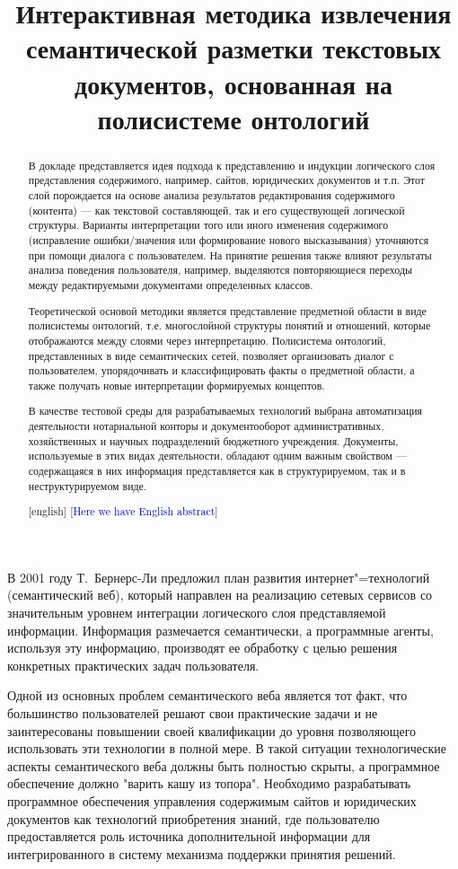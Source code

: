 \documentclass[utf8]{../IncArticle}
\title{Интерактивная методика извлечения семантической разметки
  текстовых документов, основанная на полисистеме онтологий
  \e{Первоначальный заголовок: Методика ПРИОБРЕТЕНИЯ знаний из
    текстовых документов, основанная на анализе ответов пользователя и
    полисистеме онтологий} }
\date{}
\newcommand{\e}[2][fcolor]{\textcolor{pcolor}{[}\textcolor{#1}{#2}\textcolor{pcolor}{]}}
\begin{document}
\begin{abstract}

  В докладе представляется идея подхода к представлению и индукции
  логического слоя представления содержимого, например, сайтов,
  юридических документов и т.п. Этот слой порождается на основе
  анализа результатов редактирования содержимого (контента) --- как
  текстовой составляющей, так и его существующей логической структуры.
  Варианты интерпретации того или иного изменения содержимого
  (исправление ошибки/значения или формирование нового высказывания)
  уточняются при помощи диалога с пользователем.  На принятие решения
  также влияют результаты анализа поведения пользователя, например,
  выделяются повторяющиеся переходы между редактируемыми документами
  определенных классов.

  Теоретической основой методики является представление предметной
  области в виде полисистемы онтологий, т.е. многослойной структуры
  понятий и отношений, которые отображаются между слоями через
  интерпретацию.  Полисистема онтологий, представленных в виде
  семантических сетей, позволяет организовать диалог с пользователем,
  упорядочивать и классифицировать факты о предметной области, а также
  получать новые интерпретации формируемых концептов.

  В качестве тестовой среды для разрабатываемых технологий выбрана
  автоматизация деятельности нотариальной конторы и документооборот
  административных, хозяйственных и научных подразделений бюджетного
  учреждения.  Документы, используемые в этих видах деятельности,
  обладают одним важным свойством --- содержащаяся в них информация
  представляется как в структурируемом, так и в неструктурируемом
  виде.

\end{abstract}

\begin{abstract}[english]
  \e[blue]{Here we have English abstract}
\end{abstract}


\introduction{}

В 2001 году Т.~Бернерс-Ли предложил план развития интернет"=технологий
(семантический веб), который направлен на реализацию сетевых сервисов
со значительным уровнем интеграции логического слоя представляемой
информации.  Информация размечается семантически, а программные агенты,
используя эту информацию, производят ее обработку с целью решения
конкретных практических задач пользователя.

Одной из основных проблем семантического веба является тот факт, что
большинство пользователей решают свои практические задачи и не
заинтересованы повышении своей квалификации до уровня позволяющего
использовать эти технологии в полной мере.  В такой ситуации
технологические аспекты семантического веба должны быть полностью
скрыты, а программное обеспечение должно "варить кашу из
топора".  Необходимо разрабатывать программное обеспечения управления
содержимым сайтов и юридических документов как технологий приобретения
знаний, где пользователю предоставляется роль источника дополнительной
информации для интегрированного в систему механизма поддержки принятия
решений.
\end{document}
